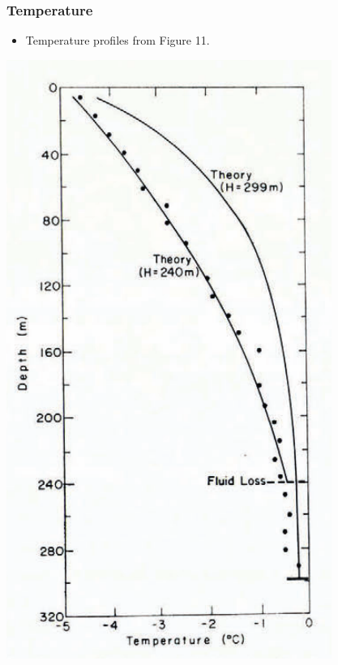 \documentclass[article,a4paper,times,11pt,twoside]{article}
\begin{document}
\subsubsection{Temperature}
\label{sec:org3f8db5c}

\begin{itemize}
\item Temperature profiles from \textcite{colbeck_1979} Figure 11.
\end{itemize}

\begin{center}
\includegraphics[width=.9\linewidth]{isua_14/isua_14.png}
\end{center}
\end{document}
